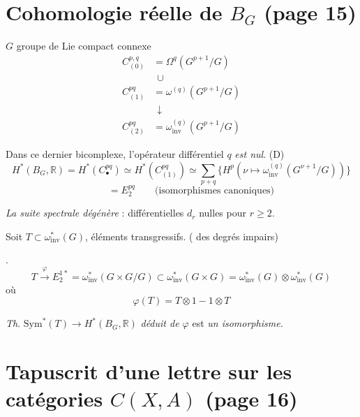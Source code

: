\documentclass[11pt,a4paper]{article}
\begin{document}
\section*{Cohomologie réelle de $B_{G}$ (page 15)}

$G$ groupe de Lie compact connexe
\[
\begin{aligned}
C_{(0)}^{p,q} &= \Omega^{q}(G^{p+1}/G) \\
&\ \ \cup \\
C_{(1)}^{pq} &= \omega^{(q)}(G^{p+1}/G) \\
&\ \ \downarrow \\
C_{(2)}^{pq} &= \omega_{\mathrm{inv}}^{(q)}(G^{p+1}/G)
\end{aligned}
\]

Dans ce dernier bicomplexe, l'opérateur différentiel  $q$ \emph{est nul}. (D\ill{})
\[
H^{*}(B_{G},\mathbb{R}) = H^{*}(C_{\bullet}^{pq}) \simeq H^{*}(C_{(1)}^{pq})
\simeq \sum_{p+q} \bigl\{ H^{p}(\nu \mapsto \omega_{\mathrm{inv}}^{(q)}
(G^{\nu+1}/G)) \bigr\}
\]
\[
\qquad = E_{2}^{pq}
\qquad \text{(isomorphismes canoniques)}
\]

\emph{La suite spectrale dégénère} : différentielles $d_{r}$ nulles pour
$r \geq 2$.

Soit $T \subset \omega_{\mathrm{inv}}^{*}(G)$, éléments transgressifs.
( \ill{} des degrés impairs)

\ill{}.
\[
T \xrightarrow{\ \varphi\ } E_{2}^{1*} = \omega_{\mathrm{inv}}^{*}(G \times
G/G) \subset \omega_{\mathrm{inv}}^{*}(G \times G) =
\omega_{\mathrm{inv}}^{*}(G) \otimes \omega_{\mathrm{inv}}^{*}(G)
\]
où
\[
\varphi(T) = T \otimes 1 - 1 \otimes T
\]

\emph{Th}. $\mathrm{Sym}^{*}(T) \to H^{*}(B_{G},\mathbb{R})$ \emph{déduit
de $\varphi$} est \emph{un isomorphisme.}

\section*{Tapuscrit d'une lettre sur les catégories $C(X,A)$ (page 16)}

\end{document}
